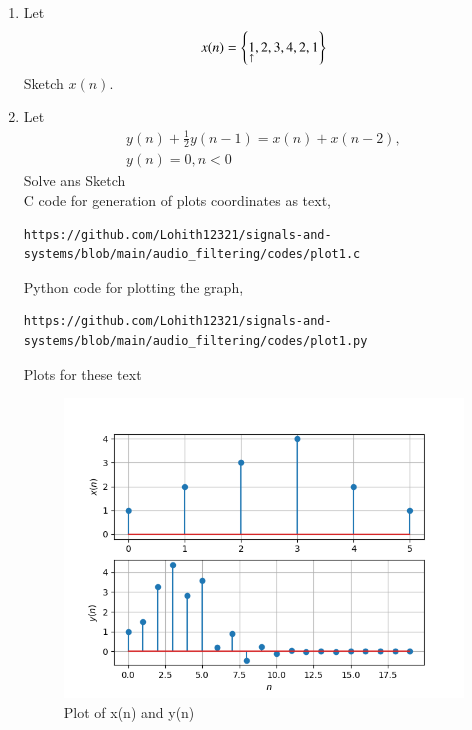 \documentclass[journal,12pt,twocolumn]{IEEEtran}
\theoremstyle{remark}
\begin{document}
\begin{enumerate}[label=\thesection.\arabic*
,ref=\thesection.\theenumi]
\begin{enumerate}[label=\thesection.\arabic*
,ref=\thesection.\theenumi]
\section{Difference equation}
\item Let
\begin{equation}
x(n) = \left\{\underset{\uparrow}{1},2,3,4,2,1\right\} \label{prob:2.1}
\end{equation}
Sketch $x(n)$.\\ 
\item Let
\begin{multline}
y(n) + \frac{1}{2}y(n-1) = x(n) + x(n-2), 
\\
y(n) = 0, n < 0 \label{prob:2.2}
\end{multline}
Solve ans Sketch\\
\solution 
C code for generation of plots coordinates as text,\\
\begin{lstlisting}
https://github.com/Lohith12321/signals-and-systems/blob/main/audio_filtering/codes/plot1.c    
\end{lstlisting}
Python code for plotting the graph,\\
\begin{lstlisting}
https://github.com/Lohith12321/signals-and-systems/blob/main/audio_filtering/codes/plot1.py   
\end{lstlisting}
Plots for these text
\begin{figure}[ht]
    \centering  
\includegraphics[width=\columnwidth]{figs/plot1.png}
\begin{center}
    \caption{Plot of x(n) and y(n)}
\end{center}
    \label{fig:plot1}
\end{figure}
\end{enumerate}
\begin{enumerate}[label=\thesection.\arabic*
,ref=\thesection.\theenumi]

\end{enumerate}
\end{enumerate}
\end{document}

